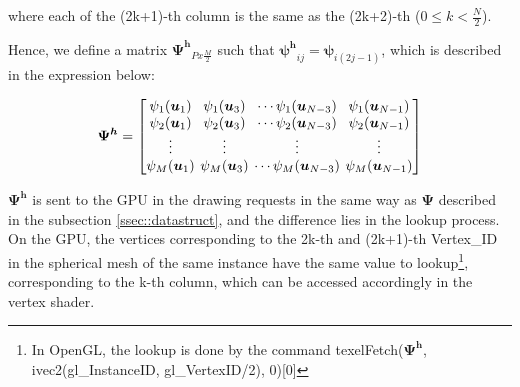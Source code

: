 \documentclass[twoside,twocolumn,10pt]{article}
\begin{document}
where each of the (2k+1)-th column is the same as the (2k+2)-th ($0 \leq k < \frac{N}{2}$).

Hence, we define a matrix $\bm{\Psi^h}_{Px\frac{M}{2}}$ such that $\bm{\psi^h}_{ij} = \bm{\psi}_{i(2j-1)}$, which is described in the expression below:


\begin{equation*}
\label{eq::Psi_changed}
\bm{\Psi^h} = 
\begingroup %
\setlength\arraycolsep{2pt}
\begin{bmatrix} 
    \psi_1(\bm{u}_1) & \psi_1(\bm{u}_3) & \cdots \psi_1(\bm{u}_{N-3}) & \psi_1(\bm{u}_{N-1})  \\
    
     \psi_2(\bm{u}_1)& \psi_2(\bm{u}_3) & \cdots \psi_2(\bm{u}_{N-3}) & \psi_2(\bm{u}_{N-1}) \\

    \vdots & \vdots & \vdots & \vdots  \\
    
     \psi_M(\bm{u}_1)&\psi_M(\bm{u}_3) & \cdots \psi_M(\bm{u}_{N-3}) & \psi_M(\bm{u}_{N-1})
    
\end{bmatrix}
\endgroup
\end{equation*}

$\bm{\Psi^h}$ is sent to the GPU in the drawing requests in the same way as $\bm{\Psi}$ described in the subsection \ref{ssec::datastruct}, and the difference lies in the lookup process. On the GPU, the vertices corresponding to the 2k-th and (2k+1)-th Vertex\_ID in the spherical mesh of the same instance have the same value to lookup\footnote{In OpenGL, the lookup is done by the command texelFetch($\bm{\Psi^h}$, ivec2(gl\_InstanceID, gl\_VertexID/2), 0)[0]}, corresponding to the k-th column, which can be accessed accordingly in the vertex shader.




\end{document}
